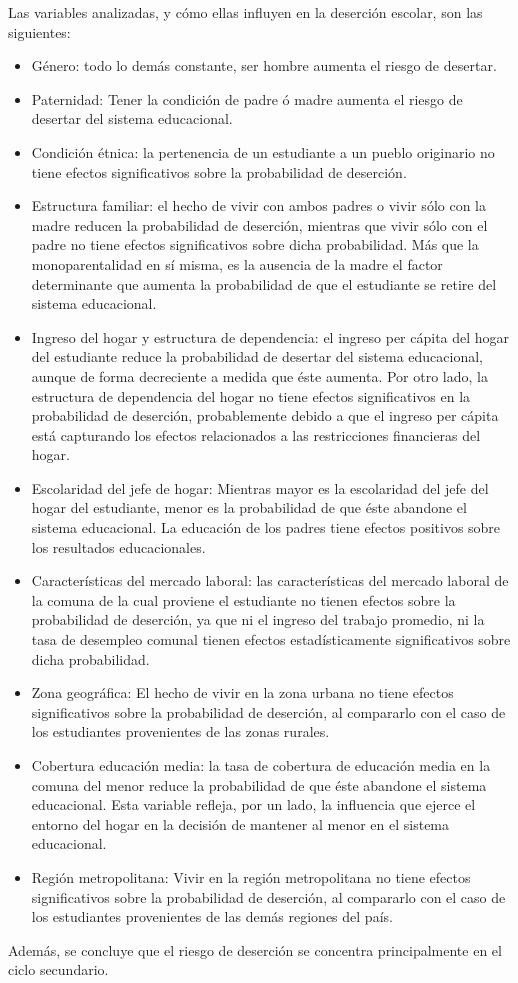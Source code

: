 Las variables analizadas, y cómo ellas influyen en la deserción escolar, son las siguientes:
\begin{itemize}
\item Género: todo lo demás constante, ser hombre aumenta el riesgo de desertar.
\item Paternidad: Tener la condición de padre ó madre aumenta el riesgo de desertar del sistema educacional.
\item Condición étnica: la pertenencia de un estudiante a un pueblo originario no tiene efectos significativos sobre la probabilidad de deserción. 
\item Estructura familiar: el hecho de vivir con ambos padres o vivir sólo con la madre reducen la probabilidad de deserción, mientras que vivir sólo con el padre no tiene efectos significativos sobre dicha probabilidad. Más que la monoparentalidad en sí misma, es la ausencia de la madre el factor determinante que aumenta la probabilidad de que el estudiante se retire del sistema educacional.
\item Ingreso del hogar y estructura de dependencia: el ingreso per cápita del hogar del estudiante reduce la probabilidad de desertar del sistema educacional, aunque de forma decreciente a medida que éste aumenta. Por otro lado, la estructura de dependencia del hogar no tiene efectos significativos en la probabilidad de deserción, probablemente debido a que el ingreso per cápita está capturando los efectos relacionados a las restricciones financieras del hogar.
\item Escolaridad del jefe de  hogar: Mientras mayor es la escolaridad del jefe del hogar del estudiante, menor es la probabilidad de que éste abandone el sistema educacional. La educación de los padres tiene efectos positivos sobre los resultados educacionales.
\item Características del mercado laboral: las características del mercado laboral de la comuna de la cual proviene el estudiante no tienen efectos sobre la probabilidad de deserción, ya que ni el ingreso del trabajo promedio, ni la tasa de desempleo comunal tienen efectos estadísticamente significativos sobre dicha probabilidad.
\item Zona geográfica: El hecho de vivir en la zona urbana no tiene efectos significativos sobre la probabilidad de deserción, al compararlo con el caso de los estudiantes provenientes de las zonas rurales.
\item Cobertura educación media: la tasa de cobertura de educación media en la comuna del menor reduce la probabilidad de que éste abandone el sistema educacional. Esta variable refleja, por un lado, la influencia que ejerce el entorno del hogar en la decisión de mantener al menor en el sistema educacional.
\item Región metropolitana: Vivir en la región metropolitana no tiene efectos significativos sobre la probabilidad de deserción, al compararlo con el caso de los estudiantes provenientes de las demás regiones del país.
\end{itemize}
Además, se concluye que el riesgo de deserción se concentra principalmente en el ciclo secundario.

